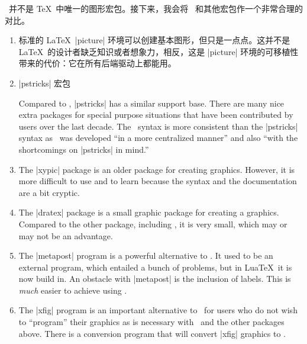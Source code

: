 \begin{onehalfspacing}

\tikzname\ 并不是 \TeX\ 中唯一的图形宏包。接下来，我会将 \tikzname\ 和其他宏包作一个非常合理的对比。
\begin{enumerate}
\item 标准的 \LaTeX\ |{picture}| 环境可以创建基本图形，但只是一点点。这并不是 \LaTeX\ 的设计者缺乏知识或者想象力，相反，这是 |{picture}| 环境的可移植性带来的代价：它在所有后端驱动上都能用。
\item 
|pstricks| 宏包

  Compared to \tikzname, |pstricks| has a similar support base. There
  are many nice extra packages for special purpose situations that have
  been contributed by users over the last decade.
  The \tikzname\ syntax is more consistent than the |pstricks| syntax
  as \tikzname\ was developed ``in a more centralized manner'' and
  also ``with the shortcomings on |pstricks| in mind.''
\item
  The |xypic| package is an older package for creating
  graphics. However, it is more difficult to use and to learn because
  the syntax and the documentation are a bit cryptic.
\item
  The |dratex| package is a small graphic package for creating a
  graphics. Compared to the other package, including \tikzname, it is
  very small, which may or may not be an advantage.
\item
  The |metapost| program is a powerful alternative to
  \tikzname. It used to be an external program, which entailed a
  bunch of problems, but in Lua\TeX\ it is now build in. An obstacle
  with |metapost| is the inclusion of labels. This is \emph{much}
  easier to achieve using \pgfname. 
\item
  The |xfig| program is an important alternative to \tikzname\ for
  users who do not wish to ``program'' their graphics as is necessary
  with \tikzname\ and the other packages above. There is a conversion
  program that will convert |xfig| graphics to \tikzname.
\end{enumerate}

\end{onehalfspacing}

